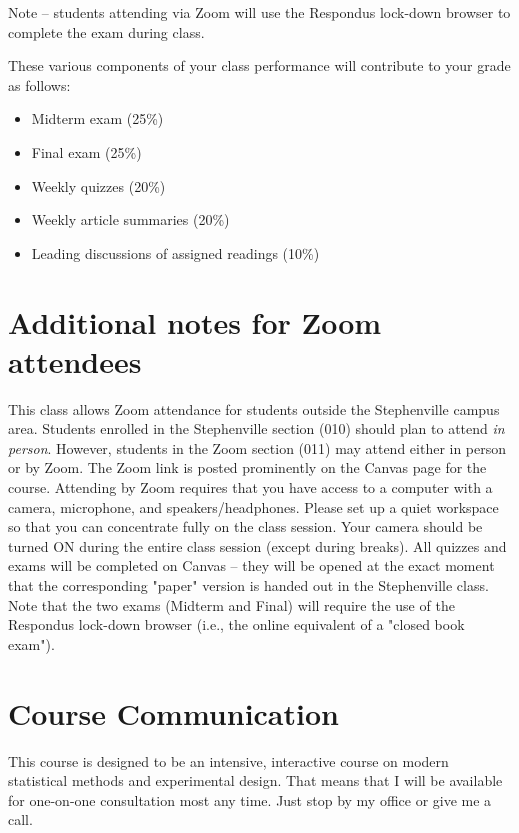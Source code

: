 \documentclass[10pt]{article}
\begin{document}
Note -- students attending via Zoom will use the Respondus lock-down browser to complete the exam during class.

These various components of your class performance will contribute to your grade as follows:

\begin{itemize}
\item Midterm exam (25\%)
\item Final exam (25\%)
\item Weekly quizzes (20\%)
\item Weekly article summaries (20\%)
\item Leading discussions of assigned readings (10\%)
\end{itemize}

\section*{Additional notes for Zoom attendees}
\label{sec:orgb75deab}

This class allows Zoom attendance for students outside the Stephenville campus area. Students enrolled in the Stephenville section (010) should plan to attend \emph{in person}. However, students in the Zoom section (011) may attend either in person or by Zoom. The Zoom link is posted prominently on the Canvas page for the course. Attending by Zoom requires that you have access to a computer with a camera, microphone, and speakers/headphones. Please set up a quiet workspace so that you can concentrate fully on the class session. Your camera should be turned ON during the entire class session (except during breaks). All quizzes and exams will be completed on Canvas -- they will be opened at the exact moment that the corresponding "paper" version is handed out in the Stephenville class. Note that the two exams (Midterm and Final) will require the use of the Respondus lock-down browser (i.e., the online equivalent of a "closed book exam").

\section*{Course Communication}
\label{sec:orgc4c4c01}

This course is designed to be an intensive, interactive course on modern statistical methods and experimental design.  That means that I will be available for one-on-one consultation most any time.  Just stop by my office or give me a call.
\end{document}
